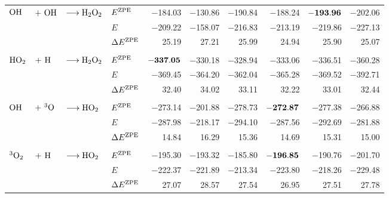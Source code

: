 \begin{table}[t!]
\begin{adjustbox}{width=1.0\textwidth,center}
\begin{tabular}{lll|lDDDDD|r}
    $\text O \text H$&$+\ \ho$&$\longrightarrow\text H _2 \text O_2$ & $E^{\text{ZPE}}$ & $-$184.03 &
    $-$130.86 & $-$190.84 & $-$188.24 & $\mathbf{-193.96}$ & $-202.06$ \\
      & & & $E$   & $-$209.22 & $-$158.07 & $-$216.83 & $-$213.19 & $-$219.86 & $-$227.13 \\
      & & & $\Delta{E}^{\text{ZPE}}$ & 25.19 & 27.21 & 25.99 & 24.94 & 25.90 & 25.07 \\[2pt]
    \hline
       & & & & & & & & &  \\[-10pt]
    $\text H \text O_2$&$+\ \te{H}$&$\longrightarrow\text H _2 \text O_2$ &
    $E^{\text{ZPE}}$ & $\mathbf{-337.05}$ & $-$330.18 & $-$328.94 & $-$333.06 & $-$336.51
    & $-$360.28 \\
      & & & $E$   & $-$369.45 & $-$364.20 & $-$362.04 & $-$365.28 & $-$369.52 & $-$392.71 \\
      & & & $\Delta{E}^{\text{ZPE}}$ & 32.40 & 34.02 & 33.11 & 32.22 & 33.01 & 32.44 \\[2pt]
    \hline
       & & & & & & & & &  \\[-10pt]
    $\text O \text H$&$+\ \tripo$&$\longrightarrow\text H \text O_2$ & $E^{\text{ZPE}}$ & $-$273.14 &
    $-$201.88 & $-$278.73 & $\mathbf{-272.87}$ & $-$277.38 & $-$266.88 \\
      & & & $E$   & $-$287.98 & $-$218.17 & $-$294.10 & $-$287.56 & $-$292.69 & $-$281.88 \\
      & & & $\Delta{E}^{\text{ZPE}}$ & 14.84 & 16.29 & 15.36 & 14.69 & 15.31 & 15.00 \\[2pt]
    \hline
       & & & & & & & & &  \\[-10pt]
    ${^3\text O_2}$&$+\ \te{H}$&$\longrightarrow\text H \text O_2$ & $E^{\text{ZPE}}$ & $-$195.30 &
    $-$193.32 & $-$185.80 & $-\mathbf{196.85}$ & $-$190.76 & $-$201.70 \\
      & & & $E$   & $-$222.37 & $-$221.89 & $-$213.34 & $-$223.80 & $-$218.26 & $-$229.48 \\
      & & & $\Delta{E}^{\text{ZPE}}$ & 27.07 & 28.57 & 27.54 & 26.95 & 27.51 & 27.78 \\[2pt]

\end{tabular}
\end{adjustbox}
\end{table}
